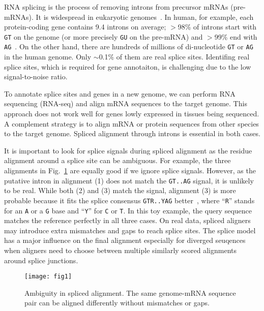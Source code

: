 \documentclass[webpdf,contemporary,large,namedate]{oup-authoring-template}%
\begin{document}
RNA splicing is the process of removing introns from precursor mRNAs (pre-mRNAs).
It is widespread in eukaryotic genomes~\citep{Keren:2010aa}.
In human, for example, each protein-coding gene contains 9.4 introns on average;
$>$98\% of introns start with {\tt GT} on the genome (or more precisely {\tt GU} on the pre-mRNA)
and $>$99\% end with {\tt AG}~\citep{Sibley:2016vh}.
On the other hand, there are hundreds of millions of di-nucleotide {\tt GT} or {\tt AG}
in the human genome.
Only $\sim$0.1\% of them are real splice sites.
Identifing real splice sites, which is required for gene annotaiton,
is challenging due to the low signal-to-noise ratio.

To annotate splice sites and genes in a new genome,
we can perform RNA sequencing (RNA-seq) and align mRNA sequences to the target genome.
This approach does not work well for genes lowly expressed in tissues being sequenced.
A complement strategy is to align mRNA or protein sequences from other species to the target genome.
Spliced alignment through introns is essential in both cases.

It is important to look for splice signals during spliced alignment
as the residue alignment around a splice site can be ambiguous.
For example, the three alignments in Fig.~\ref{fig:1} are equally good if we ignore splice signals.
However, as the putative intron in alignment (1) does not match the {\tt GT..AG}
signal, it is unlikely to be real.
While both (2) and (3) match the signal,
alignment (3) is more probable because it fits the splice consensus {\tt GTR..YAG} better~\citep{Irimia:2008aa,Iwata:2011aa},
where ``{\tt R}'' stands for an {\tt A} or a {\tt G} base and ``{\tt Y}'' for {\tt C} or {\tt T}.
In this toy example, the query sequence matches the reference perfectly in all three cases.
On real data, spliced aligners may introduce extra mismatches and gaps to reach splice sites.
The splice model has a major influence on the final alignment especially for diverged seuqences
when aligners need to choose between multiple similarly scored alignments around splice junctions.

\begin{figure}[b]
\centering
\texttt{[image: fig1]}
\caption{Ambiguity in spliced alignment.
The same genome-mRNA sequence pair can be aligned differently without mismatches or gaps.}\label{fig:1}
\end{figure}
\end{document}
